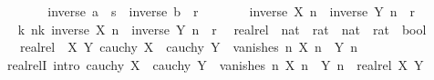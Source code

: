 \begin{isabellebody}
\ \ \ \ \isamarkupfalse%
\ \isamarkupfalse%
\ {\isacartoucheopen}inverse\ a\ {\isacharasterisk}{\kern0pt}\ s\ {\isacharasterisk}{\kern0pt}\ inverse\ b\ {\isacharequal}{\kern0pt}\ r{\isacartoucheclose}\isanewline
\ \ \ \ \isamarkupfalse%
\ \isamarkupfalse%
\ {\isachardoublequoteopen}{\isasymbar}inverse\ {\isacharparenleft}{\kern0pt}X\ n{\isacharparenright}{\kern0pt}\ {\isacharminus}{\kern0pt}\ inverse\ {\isacharparenleft}{\kern0pt}Y\ n{\isacharparenright}{\kern0pt}{\isasymbar}\ {\isacharless}{\kern0pt}\ r{\isachardoublequoteclose}\ \isacommand{{\isachardot}{\kern0pt}}\isamarkupfalse%
\isanewline
\ \ \isamarkupfalse%
\isanewline
\ \ \isamarkupfalse%
\ \isamarkupfalse%
\ {\isachardoublequoteopen}{\isasymexists}k{\isachardot}{\kern0pt}\ {\isasymforall}n{\isasymge}k{\isachardot}{\kern0pt}\ {\isasymbar}inverse\ {\isacharparenleft}{\kern0pt}X\ n{\isacharparenright}{\kern0pt}\ {\isacharminus}{\kern0pt}\ inverse\ {\isacharparenleft}{\kern0pt}Y\ n{\isacharparenright}{\kern0pt}{\isasymbar}\ {\isacharless}{\kern0pt}\ r{\isachardoublequoteclose}\ \isacommand{{\isachardot}{\kern0pt}{\isachardot}{\kern0pt}}\isamarkupfalse%
\isanewline
{}\isamarkupfalse%
%
\endisatagproof
{\isafoldproof}%
%
\isadelimproof
%
\endisadelimproof
%
\isadelimdocument
%
\endisadelimdocument
%
\isatagdocument
%
\isamarkuptrue%
%
\endisatagdocument
{\isafolddocument}%
%
\isadelimdocument
%
\endisadelimdocument
{}\isamarkupfalse%
\ realrel\ {\isacharcolon}{\kern0pt}{\isacharcolon}{\kern0pt}\ {\isachardoublequoteopen}{\isacharparenleft}{\kern0pt}nat\ {\isasymRightarrow}\ rat{\isacharparenright}{\kern0pt}\ {\isasymRightarrow}\ {\isacharparenleft}{\kern0pt}nat\ {\isasymRightarrow}\ rat{\isacharparenright}{\kern0pt}\ {\isasymRightarrow}\ bool{\isachardoublequoteclose}\isanewline
\ \ \ {\isachardoublequoteopen}realrel\ {\isacharequal}{\kern0pt}\ {\isacharparenleft}{\kern0pt}{\isasymlambda}X\ Y{\isachardot}{\kern0pt}\ cauchy\ X\ {\isasymand}\ cauchy\ Y\ {\isasymand}\ vanishes\ {\isacharparenleft}{\kern0pt}{\isasymlambda}n{\isachardot}{\kern0pt}\ X\ n\ {\isacharminus}{\kern0pt}\ Y\ n{\isacharparenright}{\kern0pt}{\isacharparenright}{\kern0pt}{\isachardoublequoteclose}\isanewline
\isanewline
{}\isamarkupfalse%
\ realrelI\ {\isacharbrackleft}{\kern0pt}intro{\isacharquery}{\kern0pt}{\isacharbrackright}{\kern0pt}{\isacharcolon}{\kern0pt}\ {\isachardoublequoteopen}cauchy\ X\ {\isasymLongrightarrow}\ cauchy\ Y\ {\isasymLongrightarrow}\ vanishes\ {\isacharparenleft}{\kern0pt}{\isasymlambda}n{\isachardot}{\kern0pt}\ X\ n\ {\isacharminus}{\kern0pt}\ Y\ n{\isacharparenright}{\kern0pt}\ {\isasymLongrightarrow}\ realrel\ X\ Y{\isachardoublequoteclose}\isanewline

\end{isabellebody}
